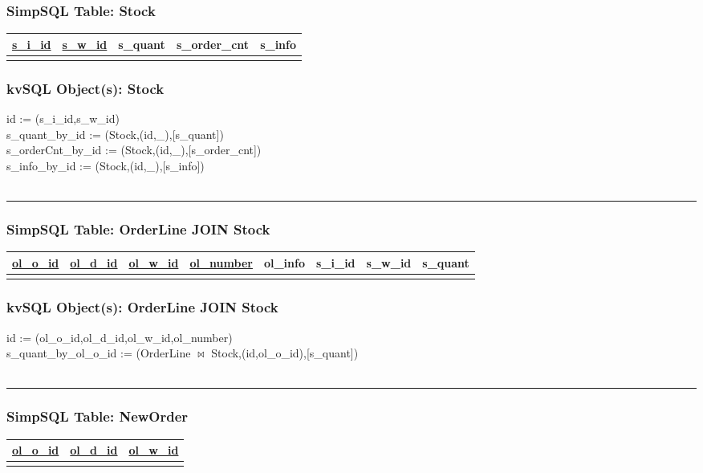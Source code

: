 \documentclass[12pt,letter]{article}
\begin{document}
\subsubsection*{SimpSQL Table: Stock}  
\begin{tabular}{ |c|c|c|c|c| }
 \hline
 \underline{s\_i\_id} & \underline{s\_w\_id} & s\_quant & s\_order\_cnt &
 s\_info \\
 \hline
 &   &   & & \\
 \hline
\end{tabular}

\subsubsection*{kvSQL Object(s): Stock}  
id := (s\_i\_id,s\_w\_id) \\
s\_quant\_by\_id :=
(Stock,(id,\_),[s\_quant]) \\
s\_orderCnt\_by\_id :=
(Stock,(id,\_),[s\_order\_cnt]) \\
s\_info\_by\_id :=
(Stock,(id,\_),[s\_info]) \\
\\ 
\hrule


\subsubsection*{SimpSQL Table: OrderLine JOIN Stock}
\begin{tabular}{ |c|c|c|c|c|c|c|c| }
 \hline
 \underline{ol\_o\_id} & \underline{ol\_d\_id} & \underline{ol\_w\_id} &
 \underline{ol\_number} & ol\_info &s\_i\_id & s\_w\_id & s\_quant \\
 \hline
 &   &   & & & & &\\
 \hline
\end{tabular}

\subsubsection*{kvSQL Object(s): OrderLine JOIN Stock}  
id := (ol\_o\_id,ol\_d\_id,ol\_w\_id,ol\_number) \\
s\_quant\_by\_ol\_o\_id :=
(OrderLine $\bowtie$ Stock,(id,ol\_o\_id),[s\_quant]) \\
\\ 
\hrule


\subsubsection*{SimpSQL Table: NewOrder}
\begin{tabular}{ |c|c|c| }
 \hline
 \underline{ol\_o\_id} & \underline{ol\_d\_id} & \underline{ol\_w\_id}\\
 \hline
 &   &  \\
 \hline
\end{tabular}
\end{document}
